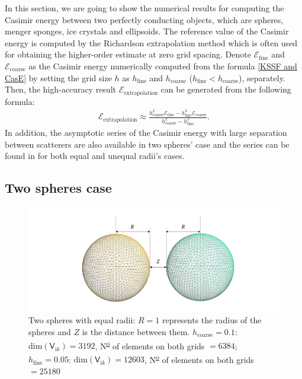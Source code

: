In this section, we are going to show the numerical results for computing the Casimir energy between two perfectly conducting objects, which are spheres, 
menger sponges, ice crystals and ellipsoids. The reference value of the Casimir energy is computed by the Richardson extrapolation method which is often used 
for obtaining the higher-order estimate at zero grid spacing. Denote $\mathcal{E}_{\text{fine}}$ and $\mathcal{E}_{\text{coarse}}$ as the Casimir energy 
numerically computed from the formula \eqref{KSSF and CasE} by setting the grid size $h$ as $h_{\text{fine}}$ and $h_{\text{coarse}}$ 
($h_{\text{fine}}<h_{\text{coarse}}$), separately. Then, the high-accuracy result $\mathcal{E}_{\text{extrapolation}}$ can be generated from the following formula:
\begin{align}\label{Richardson extrapolation}
    \mathcal{E}_{\text{extrapolation}} \approx  \frac{h_{\text{coarse}}^{2}\mathcal{E}_{\text{fine}} - h_{\text{fine}}^{2}\mathcal{E}_{\text{coarse}}}{h_{\text{coarse}}^{2} - h_{\text{fine}}^{2}}.
\end{align}
In addition, the asymptotic series of the Casimir energy with large separation between scatterers are also available in two spheres' case and the series can be found in \cite{emig2008casimir} 
for both equal and unequal radii's cases. 

\subsection{Two spheres case}
\begin{figure}[H]
    \hspace*{3cm}\includegraphics[scale = 0.6]{figures/Grid_two_spheres_dist.png}
    \caption{Two spheres with equal radii: $R = 1$ represents the radius of the spheres and $Z$ is the distance between them. 
    $h_{\text{coarse}} = 0.1$: $\text{dim}(\mathsf{V}_{\mathrm{i}k}) = 3192$,  N\textsuperscript{\underline{o}} of elements on both grids $ = 6384$;
    $h_{\text{fine}} = 0.05$: $\text{dim}(\mathsf{V}_{\mathrm{i}k}) = 12603$,  N\textsuperscript{\underline{o}} of elements on both grids $ = 25180$}
    \label{Two spheres with equal radii}
\end{figure}

